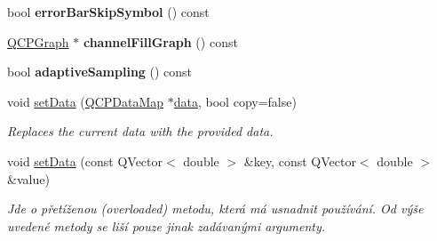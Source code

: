 \begin{DoxyCompactItemize}
\item 
\hypertarget{classQCPGraph_a04dbc050ff04561658ab1e7f3df37a01}{}bool {\bfseries error\+Bar\+Skip\+Symbol} () const \label{classQCPGraph_a04dbc050ff04561658ab1e7f3df37a01}

\item 
\hypertarget{classQCPGraph_a5369f23863e04a6164f8b66d49fd18f4}{}\hyperlink{classQCPGraph}{Q\+C\+P\+Graph} $\ast$ {\bfseries channel\+Fill\+Graph} () const \label{classQCPGraph_a5369f23863e04a6164f8b66d49fd18f4}

\item 
\hypertarget{classQCPGraph_ad3bea28ec910eedfa9b788928d610de0}{}bool {\bfseries adaptive\+Sampling} () const \label{classQCPGraph_ad3bea28ec910eedfa9b788928d610de0}

\item 
void \hyperlink{classQCPGraph_a1df2fd710545c8ba3b2c99a39a27bf8b}{set\+Data} (\hyperlink{qcustomplot_8h_a84a9c4a4c2216ccfdcb5f3067cda76e3}{Q\+C\+P\+Data\+Map} $\ast$\hyperlink{classQCPGraph_a2f58436df4f86a2792b776a21642b3d9}{data}, bool copy=false)
\begin{DoxyCompactList}\small\item\em Replaces the current data with the provided {\itshape data}. \end{DoxyCompactList}\item 
void \hyperlink{classQCPGraph_a4c55d8ac13bfa42c8c93747820891a76}{set\+Data} (const Q\+Vector$<$ double $>$ \&key, const Q\+Vector$<$ double $>$ \&value)
\begin{DoxyCompactList}\small\item\em Jde o přetíženou (overloaded) metodu, která má usnadnit používání. Od výše uvedené metody se liší pouze jinak zadávanými argumenty.


\end{DoxyCompactList}
\end{DoxyCompactItemize}
